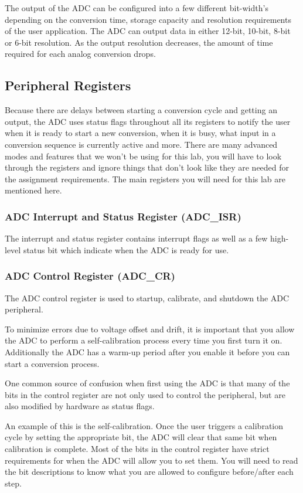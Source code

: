 \documentclass[openany,11pt,fleqn]{book} %
\begin{document}
The output of the ADC can be configured into a few different bit-width's depending on the conversion time, storage capacity and resolution requirements of the user application. The ADC can output data in either 12-bit, 10-bit, 8-bit or 6-bit resolution. As the output resolution decreases, the amount of time required for each analog conversion drops.

\subsection{Peripheral Registers}
Because there are delays between starting a conversion cycle and getting an output, the ADC uses status flags throughout all its registers to notify the user when it is ready to start a new conversion, when it is busy, what input in a conversion sequence is currently active and more. There are many advanced modes and features that we won't be using for this lab, you will have to look through the registers and ignore things that don't look like they are needed for the assignment requirements. The main registers you will need for this lab are mentioned here.

\subsubsection{ADC Interrupt and Status Register (ADC\_ISR)}
The interrupt and status register contains interrupt flags as well as a few high-level status bit which indicate when the ADC is ready for use. 

\subsubsection{ADC Control Register (ADC\_CR)}
The ADC control register is used to startup, calibrate, and shutdown the ADC peripheral. 

To minimize errors due to voltage offset and drift, it is important that you allow the ADC to perform a self-calibration process every time you first turn it on. Additionally the ADC has a warm-up period after you enable it before you can start a conversion process. 

\begin{warning}
    One common source of confusion when first using the ADC is that many of the bits in the control register are not only used to control the peripheral, but are also modified by hardware as status flags. 
      
    An example of this is the self-calibration. Once the user triggers a calibration cycle by setting the appropriate bit, the ADC will clear that same bit when calibration is complete. Most of the bits in the control register have strict requirements for when the ADC will allow you to set them. You will need to read the bit descriptions to know what you are allowed to configure before/after each step.
\end{warning}    
\end{document}
